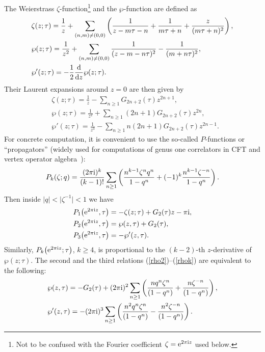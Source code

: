 \documentclass[10pt,a4paper]{amsart}
\numberwithin{equation}{section}
\theoremstyle{definition}
\begin{document}
The Weierstrass $\zeta$-function\footnote{Not to be confused with the Fourier coefficient $\zeta={\rm e}^{2 \pi {\rm i} z}$ used below.} and the $\wp$-function are defined as
\begin{align*}
&\zeta(z;\tau) =\frac1z+\sum_{(n,m) \neq (0,0)} \left(\frac{1}{z-m \tau-n}+\frac{1}{m\tau+n}+\frac{z}{(m\tau+n)^2} \right),\\
&\wp(z; \tau) =\frac{1}{z^2}+\sum_{(n,m) \neq (0,0)} \frac{1}{(z-m-n\tau)^2}-\frac{1}{(m+n \tau)^2}, \\
&\wp'(z;\tau)=-\frac{1}{2} \frac{{\rm d}}{{\rm d}z} \wp(z;\tau).
\end{align*}
Their Laurent expansions around $z=0$ are then given by
\begin{align*}
&\zeta(z;\tau) =\frac{1}{z}-\sum_{n \geq 1} G_{2n+2}(\tau)z^{2n+1}, \\
&\wp(z;\tau)=\frac{1}{z^2} + \sum_{n \geq 1} (2n+1)G_{2n+2}(\tau) z^{2n}, \\
&\wp'(z;\tau)=\frac{1}{z^3} - \sum_{n \geq 1} n(2n+1) G_{2n+2}(\tau) z^{2n-1}.
\end{align*}
For concrete computation, it is convenient to use the so-called $P$-functions or ``propagators'' (widely used for computations of genus one correlators in CFT and vertex operator algebra~\cite{Zhu}):
\[
P_k(\zeta;q)=\frac{(2 \pi {\rm i})^k}{(k-1)!} \sum_{n \geq 1} \left( \frac{n^{k-1} \zeta^{n}q^n}{1-q^n}+ (-1)^k \frac{n^{k-1} \zeta^{-n}}{1-q^n} \right).
\]
Then inside $|q|<\bigl|\zeta^{-1}\bigr|<1$ we have
\begin{align}
\label{rho1} &P_1\bigl({\rm e}^{2 \pi {\rm i} z},\tau\bigr)=-\zeta(z;\tau)+G_2(\tau)z -\pi {\rm i}, \\
\label{rho2} &P_2\bigl({\rm e}^{2 \pi {\rm i} z}, \tau\bigr)=\wp(z,\tau)+G_2(\tau), \\
\label{rhok} &P_{3}\bigl({\rm e}^{2 \pi {\rm i} z}, \tau\bigr)=-\wp'(z,\tau).
\end{align}
Similarly, $P_k\bigl({\rm e}^{2 \pi {\rm i} z};\tau\bigr)$, $k \geq 4$, is proportional to the $(k-2)$-th $z$-derivative of $\wp(z;\tau)$.
The second and the third relations (\ref{rho2})--(\ref{rhok}) are equivalent to the following:
\begin{align*} %
& \wp(z,\tau)=-G_2(\tau)+(2 \pi {\rm i})^2 \sum_{n \geq 1} \left( \frac{n q^n \zeta^n }{(1-q^n)}+\frac{n \zeta^{-n} }{(1-q^n)} \right),\\
& \wp'(z,\tau)=-(2 \pi {\rm i})^3 \sum_{n \geq 1} \left( \frac{n^2 q^n \zeta^n }{(1-q^n)}-\frac{n^2 \zeta^{-n} }{(1-q^n)} \right).
\end{align*}
\end{document}

